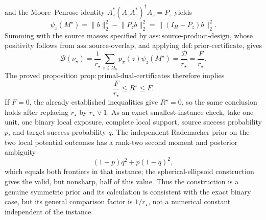 and the Moore--Penrose identity
\(A_z^{\ast}(A_zA_z^{\ast})^{\dagger}A_z=P_z\) yields
\[
 \psi_z(M^{\star})
 =\lVert b\rVert_2^2-\lVert P_zb\rVert_2^2
 =\lVert(I_H-P_z)b\rVert_2^2.
\]
Summing with the source masses specified by \(\mathrm{ass:source\mbox{-}product\mbox{-}design}\), whose positivity follows from \(\mathrm{ass:source\mbox{-}overlap}\), and applying \(\mathrm{def:prior\mbox{-}certificate}\), gives
\[
 \mathcal B(\nu_{\star})
 =\frac{1}{r_{\star}}
   \sum_{z\in\Omega_n}p_{\pi}(z)\psi_z(M^{\star})
 =\frac{\mathcal D}{r_{\star}}
 =\frac{F}{r_{\star}}.
\]
The proved proposition \(\mathrm{prop:primal\mbox{-}dual\mbox{-}certificates}\) therefore implies
\[
 \frac{F}{r_{\star}}\le R^{\star}\le F.
\]
If \(F=0\), the already established inequalities give \(R^{\star}=0\), so the same conclusion holds after replacing \(r_{\star}\) by \(r_{\star}\vee1\).  As an exact smallest-instance check, take one unit, one binary local exposure, complete local support, source success probability \(p\), and target success probability \(q\).  The independent Rademacher prior on the two local potential outcomes has a rank-two second moment and posterior ambiguity
\[
 (1-p)q^2+p(1-q)^2,
\]
which equals both frontiers in that instance; the spherical-ellipsoid construction gives the valid, but nonsharp, half of this value.  Thus the construction is a genuine symmetric prior and its calculation is consistent with the exact binary case, but its general comparison factor is \(1/r_{\star}\), not a numerical constant independent of the instance.